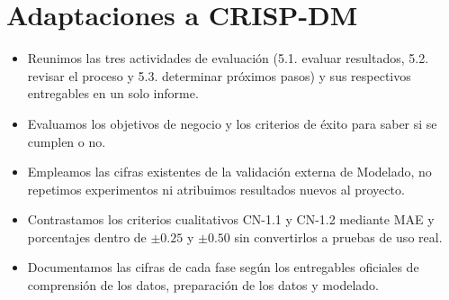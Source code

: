 \section*{Adaptaciones a CRISP-DM}

\begin{itemize}
  \item Reunimos las tres actividades de evaluación (5.1. evaluar resultados, 5.2. revisar el proceso y 5.3. determinar próximos pasos) y sus respectivos entregables en un solo informe.
  \item Evaluamos los objetivos de negocio y los criterios de éxito para saber si se cumplen o no.
  \item Empleamos las cifras existentes de la validación externa de Modelado, no repetimos experimentos ni atribuimos resultados nuevos al proyecto.
  \item Contrastamos los criterios cualitativos CN-1.1 y CN-1.2 mediante MAE y porcentajes dentro de $\pm0.25$ y $\pm0.50$ sin convertirlos a pruebas de uso real.
  \item Documentamos las cifras de cada fase según los entregables oficiales de comprensión de los datos, preparación de los datos y modelado.
\end{itemize}
